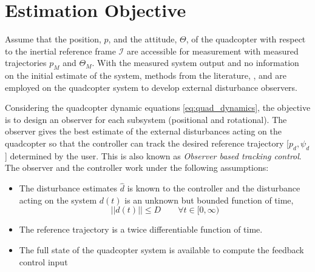 \documentclass[letterpaper%
, twoside%
, 12pt%
,memoire%
, english%
,creativecommons,hyperref%
]{thETS}
\begin{document}
\section{Estimation Objective}
Assume that the position, $p$, and the attitude, $\Theta$, of the quadcopter with respect to the inertial reference frame $\mathcal{I}$ are accessible for measurement with measured trajectories $p_{M}$ and $\Theta_{M}$. With the measured system output and no information on the initial estimate of the system, methods from the literature, \citep{RN114}, \citep{RN117} and \citep{RN83} are employed on the quadcopter system to develop external disturbance observers.

Considering the quadcopter dynamic equations \eqref{eq:quad_dynamics}, the objective is to design an observer for each subsystem (positional and rotational). The observer gives the best estimate of the external disturbances acting on the quadcopter so that the controller can track the desired reference trajectory [$p_d,\psi_d$] determined by the user. This is also known as \textit{Observer based tracking control}. The observer and the controller work under the following assumptions:
\begin{itemize}
\item The disturbance estimates $\hat{d}$ is known to the controller and the disturbance acting on the system $d(t)$ is an unknown but bounded function of time,
$$
||d(t)|| \leq D \quad \quad \forall t\in[0,\infty)
$$
\item The reference trajectory is a twice differentiable function of time.
\item The full state of the quadcopter system is available to compute the feedback control input
\end{itemize}
\end{document}

